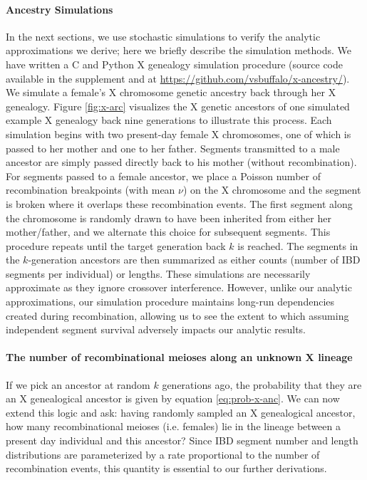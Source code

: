 \documentclass[9pt,twocolumn,twoside]{gsajnl}
\begin{document}
\paragraph{Ancestry Simulations} 

In the next sections, we use stochastic simulations to verify the analytic
approximations we derive; here we briefly describe the simulation methods. We
have written a C and Python X genealogy simulation procedure (source code
available in the supplement and at
\url{https://github.com/vsbuffalo/x-ancestry/}). We simulate a female's X
chromosome genetic ancestry back through her X genealogy. Figure
\ref{fig:x-arc} visualizes the X genetic ancestors of one simulated example X
genealogy back nine generations to illustrate this process. Each simulation
begins with two present-day female X chromosomes, one of which is passed to her
mother and one to her father. Segments transmitted to a male ancestor are
simply passed directly back to his mother (without recombination). For segments
passed to a female ancestor, we place a Poisson number of recombination
breakpoints (with mean $\nu$) on the X chromosome and the segment is broken
where it overlaps these recombination events. The first segment along the
chromosome is randomly drawn to have been inherited from either her
mother/father, and we alternate this choice for subsequent segments. This
procedure repeats until the target generation back $k$ is reached. The segments
in the $k$-generation ancestors are then summarized as either counts (number of
IBD segments per individual) or lengths.  These simulations are necessarily
approximate as they ignore crossover interference.  However, unlike our
analytic approximations, our simulation procedure maintains long-run
dependencies created during recombination, allowing us to see the extent to
which assuming independent segment survival adversely impacts our analytic
results.

\paragraph{The number of recombinational meioses along an unknown X lineage}

If we pick an ancestor at random $k$ generations ago, the probability that they
are an X genealogical ancestor is given by equation \eqref{eq:prob-x-anc}. We
can now extend this logic and ask: having randomly sampled an X genealogical
ancestor, how many recombinational meioses (i.e. females) lie in the lineage
between a present day individual and this ancestor? Since IBD segment number
and length distributions are parameterized by a rate proportional to the number
of recombination events, this quantity is essential to our further derivations.
\end{document}
